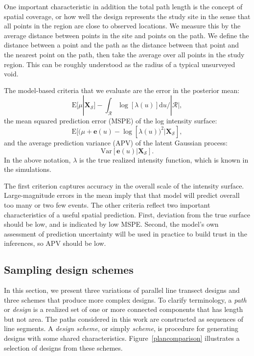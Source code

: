 \documentclass[review]{elsarticle}
\begin{document}
One important characteristic in addition the total path length is the concept
of spatial coverage, or how well the design represents the study site in the
sense that all points in the region are close to observed locations. We measure
this by the average distance between points in the site and points on the path.
We define the distance between a point and the path as the distance between that
point and the nearest point on the path, then take the average over all points
in the study region. This can be roughly understood as the radius of a typical
unsurveyed void.

The model-based criteria that we evaluate are the error in the posterior mean:
\begin{equation*}
\mathrm{E}[\mu|\mathbf{X}_{\mathcal{S}}]
- \int_{\mathcal{R}}\log[\lambda(u)] \mathrm{d}u / |\mathcal{R}|,
\end{equation*}
the mean squared prediction error (MSPE) of the log intensity surface:
\begin{equation*}
\mathrm{E}[(\mu + \mathbf{e}(u) - \log[\lambda(u))^{2}|\mathbf{X}_{\mathcal{S}}],
\end{equation*}
and the average prediction variance (APV) of the latent Gaussian process:
\begin{equation*}
\mathrm{Var}[\mathbf{e}(u)|\mathbf{X}_{\mathcal{S}}].
\end{equation*}
In the above notation, \(\lambda\) is the true realized intensity function,
which is known in the simulations.

The first criterion captures accuracy in the overall scale of the intensity
surface. Large-magnitude errors in the mean imply that that model will predict
overall too many or two few events. The other criteria reflect two important
characteristics of a useful spatial prediction. First, deviation from the true
surface should be low, and is indicated by low MSPE. Second, the model's own
assessment of prediction uncertainty will be used in practice to build trust in
the inferences, so APV should be low. 

\subsection{Sampling design schemes}
\label{methodschemes}

In this section, we present three variations of parallel line transect designs
and three schemes that produce more complex designs. To clarify terminology, a
\emph{path} or \emph{design} is a realized set of one or more connected
components that has length but not area. The paths considered in this work are
constructed as sequences of line segments. A \emph{design scheme}, or simply
\emph{scheme}, is procedure for generating designs with some shared
characteristics. Figure~\ref{plancomparison} illustrates a selection of designs
from these schemes.
\end{document}
